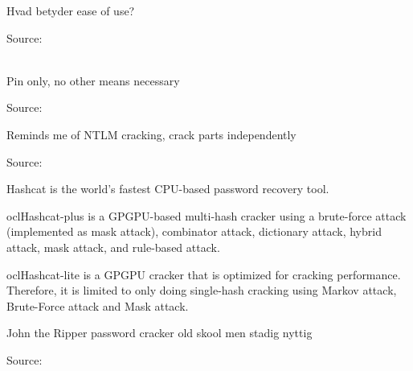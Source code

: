 \documentclass[20pt,landscape,a4paper,footrule]{foils}
\begin{document}
\centerline{Hvad betyder ease of use?}

Source: \\
\\
{\footnotesize {}}



\centerline{Pin only, no other means necessary}

Source:\\





\centerline{Reminds me of NTLM cracking, crack parts independently}

Source:\\





\begin{list2}
\item Hashcat is the world's fastest CPU-based password recovery tool.
\item oclHashcat-plus is a GPGPU-based multi-hash cracker using a brute-force attack (implemented as mask attack), combinator attack, dictionary attack, hybrid attack, mask attack, and rule-based attack.
\item oclHashcat-lite is a GPGPU cracker that is optimized for cracking performance. Therefore, it is limited to only doing single-hash cracking using Markov attack, Brute-Force attack and Mask attack.
\item John the Ripper password cracker old skool men stadig nyttig
\end{list2}

Source:\\
\\



\end{document}
